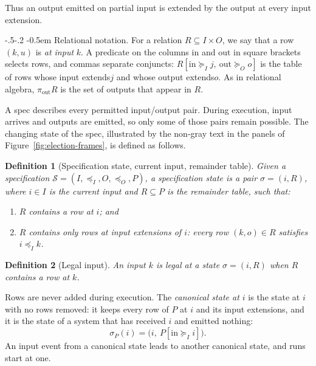 \documentclass[sigconf]{cidr-2027}
\makeatletter
\newtheorem{definition}{Definition}
\theoremstyle{remark}
\renewcommand\paragraph{\@startsection{paragraph}{4}{\z@}%
  {-.5\baselineskip \@plus -2\p@ \@minus -.2\p@}%
  {-0.5em}%
  {\normalfont\bfseries}}
\newcommand{\InputOrd}{\preceq_I}
\newcommand{\OutputOrd}{\preceq_O}
\newcommand{\InputGe}{\succeq_I}
\newcommand{\OutputGe}{\succeq_O}
\newcommand{\inrel}{extends\xspace}          %
\newcommand{\indesc}{input extension\xspace} %
\newcommand{\indescs}{input extensions\xspace}
\newcommand{\outrel}{extends\xspace}          %
\newcommand{\outrelpast}{extended\xspace}     %
\newcommand{\Spec}{\mathcal{S}}
\makeatother
\begin{document}
Thus an output emitted on partial input is \outrelpast by the output at every \indesc.

\paragraph{Relational notation.}
For a relation $R\subseteq I\times O$, we say that a row $(k,u)$ is
\emph{at input} $k$.  A predicate on the columns
$\mathrm{in}$ and $\mathrm{out}$ in square brackets selects rows, and commas
separate conjuncts: $R[\mathrm{in}\InputGe j,\ \mathrm{out}\OutputGe o]$ is the
table of rows whose input \inrel $j$ and whose output \outrel $o$.  As in
relational algebra, $\pi_{\mathrm{out}}R$ is the set of outputs that appear in
$R$.

A spec describes every permitted input/output pair.  During execution,
input arrives and outputs are emitted, so only some of those pairs remain
possible.  The changing state of the spec, illustrated by the non-gray text in
the panels of Figure~\ref{fig:election-frames}, is defined as follows.

\begin{definition}[Specification state, current input, remainder table]
\label{def:residual-state}
Given a specification $\Spec=(I,\InputOrd,O,\OutputOrd,P)$, a \emph{specification state} is a
pair $\sigma=(i,R)$, where $i\in I$ is the \emph{current input} and
$R\subseteq P$ is the \emph{remainder table}, such that:
\begin{enumerate}
  \item $R$ contains a row at $i$; and
  \item $R$ contains only rows at \indescs of $i$: every row $(k,o)\in R$ satisfies $i\InputOrd k$.
\end{enumerate}
\end{definition}

\begin{definition}[Legal input]
\label{def:legal-input}
An input $k$ is \emph{legal} at a state $\sigma=(i,R)$ when $R$ contains a row at $k$.
\end{definition}

Rows are never added during execution.  The \emph{canonical state at $i$} is
the state at $i$ with no rows removed: it keeps every row of $P$ at $i$ and its
\indescs, and it is the state of a system that has received $i$ and emitted
nothing:
\begin{equation}
  \sigma_P(i)=\bigl(i,\ P[\mathrm{in}\InputGe i]\bigr).
  \label{eq:canonical-state}
\end{equation}
An input event from a canonical state leads to another canonical state, and
runs start at one.
\end{document}
